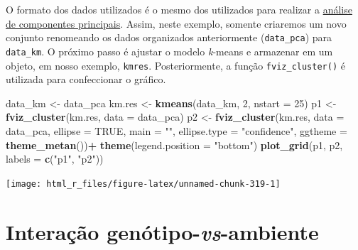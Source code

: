 \documentclass[
]{book}
\newenvironment{Shaded}{\begin{snugshade}}{\end{snugshade}}
\newcommand{\DataTypeTok}[1]{\textcolor[rgb]{0.13,0.29,0.53}{#1}}
\newcommand{\DecValTok}[1]{\textcolor[rgb]{0.00,0.00,0.81}{#1}}
\newcommand{\KeywordTok}[1]{\textcolor[rgb]{0.13,0.29,0.53}{\textbf{#1}}}
\newcommand{\NormalTok}[1]{#1}
\newcommand{\OperatorTok}[1]{\textcolor[rgb]{0.81,0.36,0.00}{\textbf{#1}}}
\newcommand{\OtherTok}[1]{\textcolor[rgb]{0.56,0.35,0.01}{#1}}
\newcommand{\StringTok}[1]{\textcolor[rgb]{0.31,0.60,0.02}{#1}}
\begin{document}
O formato dos dados utilizados é o mesmo dos utilizados para realizar a \protect\hyperlink{componentes-principais}{análise de componentes principais}. Assim, neste exemplo, somente criaremos um novo conjunto renomeando os dados organizados anteriormente (\texttt{data\_pca}) para \texttt{data\_km}. O próximo passo é ajustar o modelo \emph{k}-means e armazenar em um objeto, em nosso exemplo, \texttt{kmres}. Posteriormente, a função \texttt{fviz\_cluster()} é utilizada para confeccionar o gráfico.

\begin{Shaded}
\begin{Highlighting}[]
\NormalTok{data_km <-}\StringTok{ }\NormalTok{data_pca}
\NormalTok{km.res <-}\StringTok{ }\KeywordTok{kmeans}\NormalTok{(data_km, }\DecValTok{2}\NormalTok{, }\DataTypeTok{nstart =} \DecValTok{25}\NormalTok{)}
\NormalTok{p1 <-}\StringTok{ }\KeywordTok{fviz_cluster}\NormalTok{(km.res, }\DataTypeTok{data =}\NormalTok{ data_pca)}
\NormalTok{p2 <-}\StringTok{ }\KeywordTok{fviz_cluster}\NormalTok{(km.res,}
                   \DataTypeTok{data =}\NormalTok{ data_pca,}
                   \DataTypeTok{ellipse =} \OtherTok{TRUE}\NormalTok{,}
                   \DataTypeTok{main =} \StringTok{""}\NormalTok{,}
                   \DataTypeTok{ellipse.type =} \StringTok{"confidence"}\NormalTok{,}
                   \DataTypeTok{ggtheme =} \KeywordTok{theme_metan}\NormalTok{())}\OperatorTok{+}
\StringTok{      }\KeywordTok{theme}\NormalTok{(}\DataTypeTok{legend.position =} \StringTok{"bottom"}\NormalTok{)}
\KeywordTok{plot_grid}\NormalTok{(p1, p2, }\DataTypeTok{labels =} \KeywordTok{c}\NormalTok{(}\StringTok{"p1"}\NormalTok{, }\StringTok{"p2"}\NormalTok{))}
\end{Highlighting}
\end{Shaded}

\begin{center}\texttt{[image: html\_r\_files/figure-latex/unnamed-chunk-319-1]} \end{center}

\hypertarget{interaction}{%
\chapter{\texorpdfstring{Interação genótipo-\emph{vs}-ambiente}{Interação genótipo-vs-ambiente}}\label{interaction}}
\end{document}
